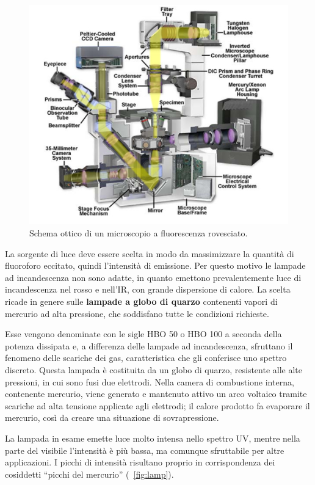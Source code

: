 \begin{figure}
 \centering
 \includegraphics[scale=.50]{img/CAP2microrovesciato.jpg}
 \caption{\small{Schema ottico di un microscopio a fluorescenza rovesciato.}}
 \label{fig:micro}
\end{figure}

La sorgente di luce deve essere scelta in modo da massimizzare la quantità di fluoroforo eccitato, quindi l'intensità di emissione. 
Per questo motivo le lampade ad incandescenza non sono adatte, in quanto emettono prevalentemente luce di incandescenza nel rosso e nell'IR, con grande dispersione di calore. 
La scelta ricade in genere sulle \textbf{lampade a globo di quarzo} contenenti vapori di mercurio ad alta pressione, che soddisfano tutte le condizioni richieste. 

Esse vengono denominate con le sigle HBO 50 o HBO 100 a seconda della potenza dissipata e, a differenza delle lampade ad incandescenza, sfruttano il fenomeno delle scariche dei gas, caratteristica che gli conferisce uno spettro discreto. 
Questa lampada è costituita da un globo di quarzo, resistente alle alte pressioni, in cui sono fusi due elettrodi. 
Nella camera di combustione interna, contenente mercurio, viene generato e mantenuto attivo un arco voltaico tramite scariche ad alta tensione applicate agli elettrodi; il calore prodotto fa evaporare il mercurio, così da creare una situazione di sovrapressione. 

La lampada in esame emette luce molto intensa nello spettro UV, mentre nella parte del visibile l'intensità è più bassa, ma comunque sfruttabile per altre applicazioni. 
I picchi di intensità risultano proprio in corrispondenza dei cosiddetti ``picchi del mercurio'' (\figurename~\ref{fig:lamp}).

